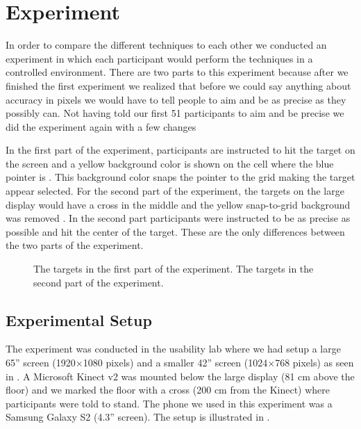 \section{Experiment} \label{sec:experiment}
In order to compare the different techniques to each other we conducted an experiment in which each participant would perform the techniques in a controlled environment.
There are two parts to this experiment because after we finished the first experiment we realized that before we could say anything about accuracy in pixels we would have to tell people to aim and be as precise as they possibly can.
Not having told our first 51 participants to aim and be precise we did the experiment again with a few changes

In the first part of the experiment, participants are instructed to hit the target on the screen and a yellow background color is shown on the cell where the blue pointer is .
This background color snaps the pointer to the grid making the target appear selected.
For the second part of the experiment, the targets on the large display would have a cross in the middle and the yellow snap-to-grid background was removed .
In the second part participants were instructed to be as precise as possible and hit the center of the target.
These are the only differences between the two parts of the experiment.
\begin{figure}[H]
\centering
{}
\hspace{0.05\columnwidth}
\caption{\protect{} The targets in the first part of the experiment. \protect{} The targets in the second part of the experiment.}
\end{figure}

\subsection{Experimental Setup} \label{sec:setup}
The experiment was conducted in the usability lab where we had setup a large 65'' screen (1920$\times$1080 pixels) and a smaller 42'' screen (1024$\times$768 pixels) as seen in .
A Microsoft Kinect v2 was mounted below the large display (81 cm above the floor) and we marked the floor with a cross (200 cm from the Kinect) where participants were told to stand.
The phone we used in this experiment was a Samsung Galaxy S2 (4.3'' screen).
The setup is illustrated in .

